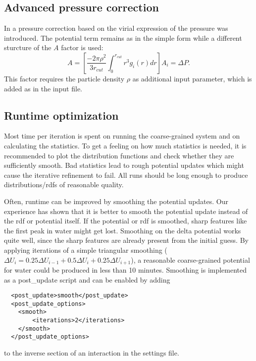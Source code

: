 \subsection{Advanced pressure correction}
In \cite{Wang:2009} a pressure correction based on the virial expression of the pressure was introduced. The potential term remains as in the simple form while a different sturcture of the $A$ factor is used:
\begin{equation}
  A = \left[\frac{-2\pi\rho^{2}}{3r_{cut}}\int_{0}^{r_{cut}}r^{3}g_{i}(r)dr\right]A_{i}=\Delta P.
\end{equation}
This factor requires the particle density $ \rho $ as additional input parameter, which is added as   in the input file.

\subsection{Runtime optimization}
\label{ref:ibi:optimize}
Most time per iteration is spent on running the coarse-grained system and on calculating the statistics. To get a feeling on how much statistics is needed, it is recommended to plot the distribution functions and check whether they are sufficiently smooth. Bad statistics lead to rough potential updates which might cause the iterative refinement to fail. All runs should be long enough to produce distributions/rdfs of reasonable quality.

Often, runtime can be improved by smoothing the potential updates. Our experience has shown that it is better to smooth the potential update instead of the rdf or potential itself. If the potential or rdf is smoothed, sharp features like the first peak in \spce water might get lost. Smoothing on the delta potential works quite well, since the sharp features are already present from the initial guess. By applying iterations of a simple triangular smoothing ($ \Delta U_i = 0.25 \Delta U_{i-1} + 0.5\Delta U_i + 0.25\Delta U_{i+1} $), a reasonable coarse-grained potential for \spce water could be produced in less than 10 minutes. Smoothing is implemented as a post\_update script and can be enabled by adding
\begin{lstlisting}
  <post_update>smooth</post_update>
  <post_update_options>
    <smooth>
        <iterations>2</iterations>
    </smooth>
  </post_update_options>
\end{lstlisting}
to the inverse section of an interaction in the settings \xml file.
